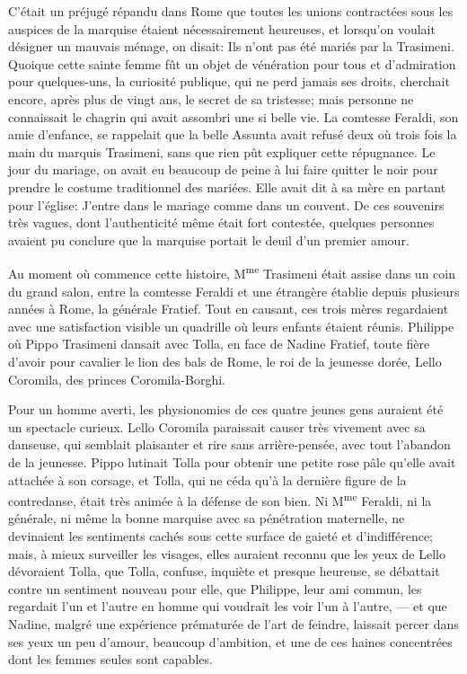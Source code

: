 C'était un préjugé répandu dans Rome que toutes les unions contractées
sous les auspices de la marquise étaient nécessairement heureuses, et
lorsqu'on voulait désigner un mauvais ménage, on disait: Ils n'ont pas
été mariés par la Trasimeni. Quoique cette sainte femme fût un objet de
vénération pour tous et d'admiration pour quelques-uns, la curiosité
publique, qui ne perd jamais ses droits, cherchait encore, après plus de
vingt ans, le secret de sa tristesse; mais personne ne connaissait le
chagrin qui avait assombri une si belle vie. La comtesse Feraldi, son
amie d'enfance, se rappelait que la belle Assunta avait refusé deux où
trois fois la main du marquis Trasimeni, sans que rien pût expliquer
cette répugnance. Le jour du mariage, on avait eu beaucoup de peine à
lui faire quitter le noir pour prendre le costume traditionnel des
mariées. Elle avait dit à sa mère en partant pour l'église: J'entre dans
le mariage comme dans un couvent. De ces souvenirs très vagues, dont
l'authenticité même était fort contestée, quelques personnes avaient pu
conclure que la marquise portait le deuil d'un premier amour.

Au moment où commence cette histoire, M\textsuperscript{me} Trasimeni
était assise dans un coin du grand salon, entre la comtesse Feraldi et
une étrangère établie depuis plusieurs années à Rome, la générale
Fratief. Tout en causant, ces trois mères regardaient avec une
satisfaction visible un quadrille où leurs enfants étaient réunis.
Philippe où Pippo Trasimeni dansait avec Tolla, en face de Nadine
Fratief, toute fière d'avoir pour cavalier le lion des bals de Rome, le
roi de la jeunesse dorée, Lello Coromila, des princes Coromila-Borghi.

Pour un homme averti, les physionomies de ces quatre jeunes gens
auraient été un spectacle curieux. Lello Coromila paraissait causer très
vivement avec sa danseuse, qui semblait plaisanter et rire sans
arrière-pensée, avec tout l'abandon de la jeunesse. Pippo lutinait Tolla
pour obtenir une petite rose pâle qu'elle avait attachée à son corsage,
et Tolla, qui ne céda qu'à la dernière figure de la contredanse, était
très animée à la défense de son bien. Ni M\textsuperscript{me} Feraldi,
ni la générale, ni même la bonne marquise avec sa pénétration
maternelle, ne devinaient les sentiments cachés sous cette surface de
gaieté et d'indifférence; mais, à mieux surveiller les visages, elles
auraient reconnu que les yeux de Lello dévoraient Tolla, que Tolla,
confuse, inquiète et presque heureuse, se débattait contre un sentiment
nouveau pour elle, que Philippe, leur ami commun, les regardait l'un et
l'autre en homme qui voudrait les voir l'un à l'autre, --- et que
Nadine, malgré une expérience prématurée de l'art de feindre, laissait
percer dans ses yeux un peu d'amour, beaucoup d'ambition, et une de ces
haines concentrées dont les femmes seules sont capables.

